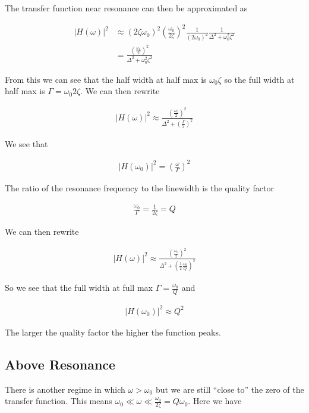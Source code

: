 \documentclass[12pt]{article}
\begin{document}
The transfer function near resonance can then be approximated as

\begin{align}
|H(\omega)|^2 &\approx (2\zeta \omega_0)^2 \left(\frac{\omega_0}{2\zeta} \right)^2 \frac{1}{(2\omega_0)^2} \frac{1}{\Delta^2 + \omega_0^2 \zeta^2}\\
&= \frac{\left(\frac{\omega_0}{2} \right)^2}{\Delta^2 + \omega_0^2\zeta^2}
\end{align}

From this we can see that the half width at half max is $\omega_0 \zeta$ so the full width at half max is $\Gamma = \omega_0 2 \zeta$. We can then rewrite

\begin{align}
|H(\omega)|^2 \approx \frac{\left(\frac{\omega_0}{2} \right)^2}{\Delta^2 + \left(\frac{\Gamma}{2} \right)^2}
\end{align}

We see that

\begin{align}
|H(\omega_0)|^2 = \left(\frac{\omega}{\Gamma}\right)^2
\end{align}

The ratio of the resonance frequency to the linewidth is the quality factor

\begin{align}
\frac{\omega_0}{\Gamma} = \frac{1}{2\zeta} = Q
\end{align}

We can then rewrite

\begin{align}
|H(\omega)|^2 \approx \frac{\left(\frac{\omega_0}{2}\right)^2}{\Delta^2 + \left(\frac{1}{2} \frac{\omega_0}{Q} \right)^2}
\end{align}

So we see that the full width at full max $\Gamma = \frac{\omega_0}{Q}$ and

\begin{align}
|H(\omega_0)|^2 \approx Q^2
\end{align}

The larger the quality factor the higher the function peaks.

\subsection{Above Resonance}

There is another regime in which $\omega > \omega_0$ but we are still ``close to'' the zero of the transfer function. This means $\omega_0 \ll \omega \ll \frac{\omega_0}{2\zeta} = Q \omega_0$. Here we have
\end{document}

